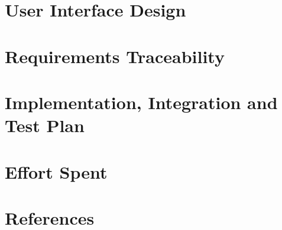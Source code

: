 \documentclass{config/PoliMi3i_thesis}
\numberwithin{algorithm}{chapter}
\begin{document}
\pagebreak
\chapter{User Interface Design}


\pagebreak
\chapter{Requirements Traceability}


\pagebreak
\chapter{Implementation, Integration and Test Plan}


\pagebreak
\chapter{Effort Spent}


\pagebreak
\chapter{References}


\pagebreak
\listoffigures
\end{document}
